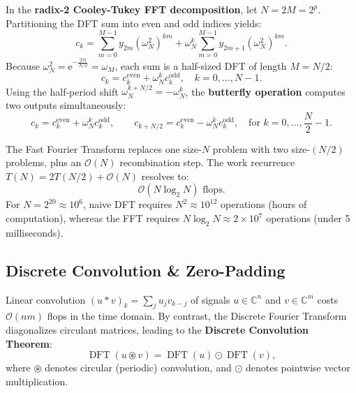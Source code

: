 \begin{theorem}
    In the \textbf{radix-2 Cooley-Tukey FFT decomposition}, let $N = 2M = 2^p$. Partitioning the DFT sum into even and odd indices yields:
    \begin{equation}
        c_k = \sum_{m=0}^{M-1} y_{2m} \left(\omega_N^2\right)^{k m} + \omega_N^k \sum_{m=0}^{M-1} y_{2m+1} \left(\omega_N^2\right)^{k m}.
    \end{equation}
    Because $\omega_N^2 = \mathrm{e}^{-\frac{2\pi \mathrm{i}}{N/2}} = \omega_{M}$, each sum is a half-sized DFT of length $M = N/2$:
    \begin{equation}
        c_k = c_k^{\text{even}} + \omega_N^k c_k^{\text{odd}}, \quad k = 0, \dots, N-1.
    \end{equation}
    Using the half-period shift $\omega_N^{k + N/2} = -\omega_N^k$, the \textbf{butterfly operation} computes two outputs simultaneously:
    \begin{equation}
        c_k = c_k^{\text{even}} + \omega_N^k c_k^{\text{odd}}, \qquad c_{k + N/2} = c_k^{\text{even}} - \omega_N^k c_k^{\text{odd}}, \quad \text{for } k = 0, \dots, \frac{N}{2}-1.
    \end{equation}
\end{theorem}

The Fast Fourier Transform replaces one size-$N$ problem with two size-$(N/2)$ problems, plus an $\mathcal{O}(N)$ recombination step. The work recurrence $T(N) = 2 T(N/2) + \mathcal{O}(N)$ resolves to:
\begin{equation}
    \mathcal{O}(N \log_2 N) \text{ flops}.
\end{equation}
For $N = 2^{20} \approx 10^6$, naive DFT requires $N^2 \approx 10^{12}$ operations (hours of computation), whereas the FFT requires $N \log_2 N \approx 2 \times 10^7$ operations (under 5 milliseconds).

\subsection{Discrete Convolution \& Zero-Padding}

Linear convolution $(u * v)_k = \sum_j u_j v_{k-j}$ of signals $u \in \mathbb{C}^n$ and $v \in \mathbb{C}^m$ costs $\mathcal{O}(n m)$ flops in the time domain. By contrast, the Discrete Fourier Transform diagonalizes circulant matrices, leading to the \textbf{Discrete Convolution Theorem}:
\begin{equation}
    \operatorname{DFT}(u \circledast v) = \operatorname{DFT}(u) \odot \operatorname{DFT}(v),
\end{equation}
where $\circledast$ denotes circular (periodic) convolution, and $\odot$ denotes pointwise vector multiplication.

